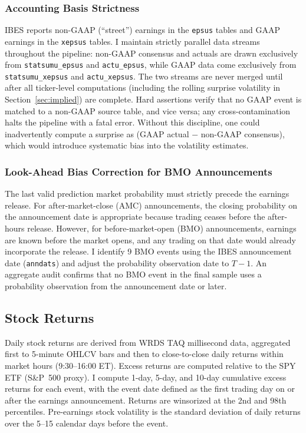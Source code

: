 \documentclass[11pt]{article}
\begin{document}
\subsubsection{Accounting Basis Strictness}

IBES reports non-GAAP (``street'') earnings in the \texttt{epsus} tables and GAAP earnings in the \texttt{xepsus} tables. I maintain strictly parallel data streams throughout the pipeline: non-GAAP consensus and actuals are drawn exclusively from \texttt{statsumu\_epsus} and \texttt{actu\_epsus}, while GAAP data come exclusively from \texttt{statsumu\_xepsus} and \texttt{actu\_xepsus}. The two streams are never merged until after all ticker-level computations (including the rolling surprise volatility in Section~\ref{sec:implied}) are complete. Hard assertions verify that no GAAP event is matched to a non-GAAP source table, and vice versa; any cross-contamination halts the pipeline with a fatal error. Without this discipline, one could inadvertently compute a surprise as (GAAP actual $-$ non-GAAP consensus), which would introduce systematic bias into the volatility estimates.

\subsubsection{Look-Ahead Bias Correction for BMO Announcements}

The last valid prediction market probability must strictly precede the earnings release. For after-market-close (AMC) announcements, the closing probability on the announcement date is appropriate because trading ceases before the after-hours release. However, for before-market-open (BMO) announcements, earnings are known before the market opens, and any trading on that date would already incorporate the release. I identify 9 BMO events using the IBES announcement date (\texttt{anndats}) and adjust the probability observation date to $T-1$. An aggregate audit confirms that no BMO event in the final sample uses a probability observation from the announcement date or later.

\subsection{Stock Returns}

Daily stock returns are derived from WRDS TAQ millisecond data, aggregated first to 5-minute OHLCV bars and then to close-to-close daily returns within market hours (9:30--16:00 ET). Excess returns are computed relative to the SPY ETF (S\&P~500 proxy). I compute 1-day, 5-day, and 10-day cumulative excess returns for each event, with the event date defined as the first trading day on or after the earnings announcement. Returns are winsorized at the 2nd and 98th percentiles. Pre-earnings stock volatility is the standard deviation of daily returns over the 5--15 calendar days before the event.
\end{document}
